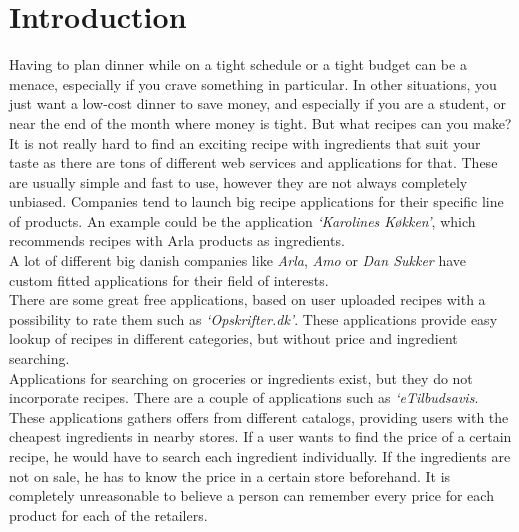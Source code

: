\chapter{Introduction}
\label{chap:intro}

Having to plan dinner while on a tight schedule or a tight budget can be a menace, especially if you crave something in particular. In other situations, you just want a low-cost dinner to save money, and especially if you are a student, or near the end of the month where money is tight. But what recipes can you make?\\
It is not really hard to find an exciting recipe with ingredients that suit your taste as there are tons of different web services and applications for that. These are usually simple and fast to use, however they are not always completely unbiased. Companies tend to launch big recipe applications for their specific line of products. An example could be the application \emph{`Karolines Køkken'}\cite{arla}, which recommends recipes with Arla products as ingredients.\\ A lot of different big danish companies like \textit{Arla}, \textit{Amo} or \textit{Dan Sukker} have custom fitted applications for their field of interests. \\
There are some great free applications, based on user uploaded recipes with a possibility to rate them such as \emph{`Opskrifter.dk'}\cite{opskrifterdk}. These applications provide easy lookup of recipes in different categories, but without price and ingredient searching. \\
Applications for searching on groceries or ingredients exist, but they do not incorporate recipes. There are a couple of applications such as \emph{`eTilbudsavis}\cite{etilbudsavis}. These applications gathers offers from different catalogs, providing users with the cheapest ingredients in nearby stores. If a user wants to find the price of a certain recipe, he would have to search each ingredient individually. If the ingredients are not on sale, he has to know the price in a certain store beforehand. It is completely unreasonable to believe a person can remember every price for each product for each of the retailers.






